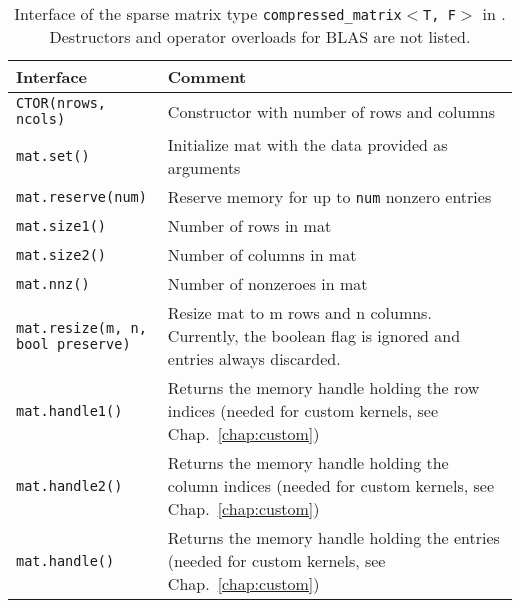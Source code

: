 \begin{table}[tb]
\begin{center}
\begin{tabular}{p{6.5cm}|p{8cm}}
Interface & Comment\\
\hline
\texttt{CTOR(nrows, ncols)}    & Constructor with number of rows and columns \\
\texttt{mat.set()}    & Initialize mat with the data provided as arguments \\
\texttt{mat.reserve(num)}    & Reserve memory for up to \texttt{num} nonzero entries \\

\texttt{mat.size1()}            & Number of rows in mat \\
\texttt{mat.size2()}            & Number of columns in mat \\
\texttt{mat.nnz()}		& Number of nonzeroes in mat \\
\parbox{6cm}{\texttt{mat.resize(m, n, \\
           \hphantom{mat.resize(}bool preserve)}}    & Resize mat to m rows and n columns. Currently, the boolean flag is ignored and entries always discarded. \\
\texttt{mat.handle1()}  & Returns the memory handle holding the row indices (needed for custom kernels, see Chap.~\ref{chap:custom}) \\
\texttt{mat.handle2()}  & Returns the memory handle holding the column indices  (needed for custom kernels, see Chap.~\ref{chap:custom}) \\
\texttt{mat.handle()}  & Returns the memory handle holding the entries (needed for custom kernels, see Chap.~\ref{chap:custom})
\end{tabular}
\caption{Interface of the sparse matrix type \texttt{compressed\_matrix$<$T, F$>$} in \ViennaCL. Destructors and operator overloads for BLAS are not listed.}
\label{tab:compressed-matrix-interface}
\end{center}
\end{table}

